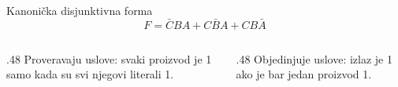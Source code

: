 \begin{frame}[label=02-s014]{Kanonička disjunktivna forma}
\[F=\bar CBA+C\bar BA+CB\bar A\]
\par\vspace{4mm}
\par{}
\par\vspace{5mm}
\begin{columns}[T,onlytextwidth]
\begin{column}{.48\textwidth}
Proveravaju uslove: svaki proizvod je 1 samo kada su svi njegovi literali 1.
\end{column}
\begin{column}{.48\textwidth}
Objedinjuje uslove: izlaz je 1 ako je bar jedan proizvod 1.
\end{column}
\end{columns}
\end{frame}
